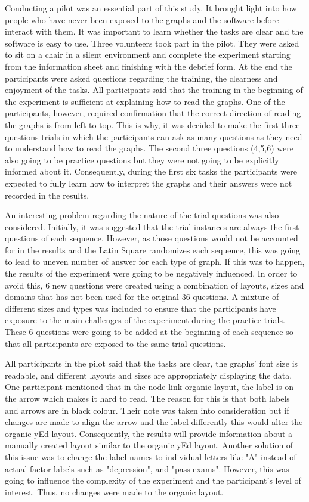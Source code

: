 \documentclass{l4proj}
\begin{document}
Conducting a pilot was an essential part of this study. It brought light into how people who have never been exposed to the graphs and the software before interact with them. It was important to learn whether the tasks are clear and the software is easy to use. Three volunteers took part in the pilot. They were asked to sit on a chair in a silent environment and complete the experiment starting from the information sheet and finishing with the debrief form. At the end the participants were asked questions regarding the training, the clearness and enjoyment of the tasks. All participants said that the training in the beginning of the experiment is sufficient at explaining how to read the graphs. One of the participants, however, required confirmation that the correct direction of reading the graphs is from left to top. This is why, it was decided to make the first three questions trials in which the participants can ask as many questions as they need to understand how to read the graphs. The second three questions (4,5,6) were also going to be practice questions but they were not going to be explicitly informed about it. Consequently, during the first six tasks the participants were expected to fully learn how to interpret the graphs and their answers were not recorded in the results. 

An interesting problem regarding the nature of the trial questions was also considered. Initially, it was suggested that the trial instances are always the first questions of each sequence. However, as those questions would not be accounted for in the results and the Latin Square randomizes each sequence, this was going to lead to uneven number of answer for each type of graph. If this was to happen, the results of the experiment were going to be negatively influenced. In order to avoid this, 6 new questions were created using a combination of layouts, sizes and domains that has not been used for the original 36 questions. A mixture of different sizes and types was included to ensure that the participants have exposure to the main challenges of the experiment during the practice trials. These 6 questions were going to be added at the beginning of each sequence so that all participants are exposed to the same trial questions.  

All participants in the pilot said that the tasks are clear, the graphs' font size is readable, and different layouts and sizes are appropriately displaying the data. One participant mentioned that in the node-link organic layout, the label is on the arrow which makes it hard to read. The reason for this is that both labels and arrows are in black colour. Their note was taken into consideration but if changes are made to align the arrow and the label differently this would alter the organic yEd layout. Consequently, the results will provide information about a manually created layout similar to the organic yEd layout. Another solution of this issue was to change the label names to individual letters like "A" instead of actual factor labels such as "depression", and "pass exams". However, this was going to influence the complexity of the experiment and the participant's level of interest. Thus, no changes were made to the organic layout.
\end{document}

